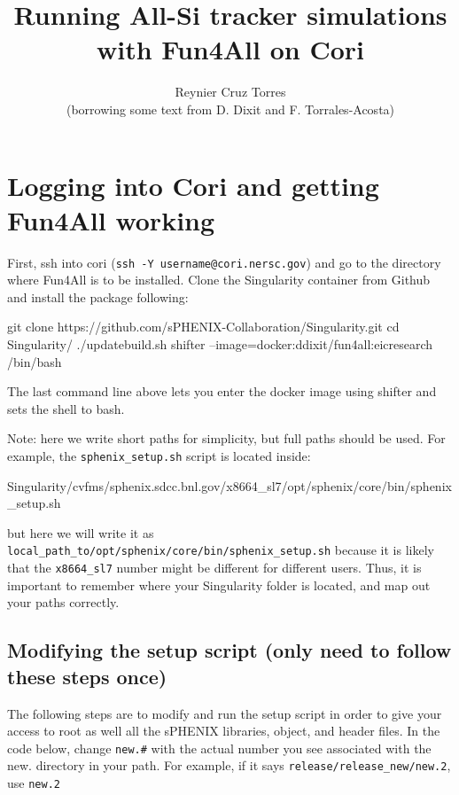 \documentclass[12pt]{article}
\title{Running All-Si tracker simulations with Fun4All on Cori}
\author{Reynier Cruz Torres \\ (borrowing some text from D. Dixit and F. Torrales-Acosta)}
\begin{document}
\maketitle

\tableofcontents

\newpage
\section{Logging into Cori and getting Fun4All working}

First, ssh into cori (\verb|ssh -Y username@cori.nersc.gov|) and go to the directory where Fun4All is to be installed.
Clone the Singularity container from Github and install the package following:

\begin{tcolorbox}
\begin{verbnobox}[\scriptsize]
git clone https://github.com/sPHENIX-Collaboration/Singularity.git
cd Singularity/
./updatebuild.sh
shifter --image=docker:ddixit/fun4all:eicresearch /bin/bash
\end{verbnobox}  
\end{tcolorbox}

The last command line above lets you enter the docker image using shifter and sets the shell to bash.

Note: here we write short paths for simplicity, but full paths should be used.
For example, the \verb|sphenix_setup.sh| script is located inside:

\begin{tcolorbox}
\begin{verbnobox}[\scriptsize]
Singularity/cvfms/sphenix.sdcc.bnl.gov/x8664_sl7/opt/sphenix/core/bin/sphenix_setup.sh
\end{verbnobox}  
\end{tcolorbox}

but here we will write it as \verb|local_path_to/opt/sphenix/core/bin/sphenix_setup.sh| because it is likely that the \verb|x8664_sl7| number might be different for different users.
Thus, it is important to remember where your Singularity folder is located, and map out your paths correctly.

\subsection{Modifying the setup script (only need to follow these steps once)}
The following steps are to modify and run the setup script in order to give your access to root as well all the sPHENIX libraries, object, and header files.
In the code below, change \verb|new.#| with the actual number you see associated with the new. directory in your path. For example, if it says \verb|release/release_new/new.2|, use \verb|new.2|
\end{document}

